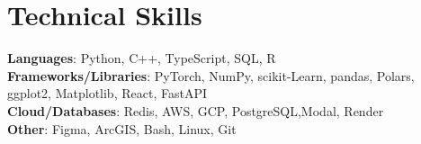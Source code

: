 \documentclass[letterpaper,10pt]{article}
\begin{document}
\section{Technical Skills}
 \begin{itemize}[leftmargin=0.15in, label={}]
    \small{\item{
     \textbf{Languages}{: Python, C++, TypeScript, SQL, R} \\
     \textbf{Frameworks/Libraries}{: PyTorch, NumPy, scikit-Learn, pandas, Polars, ggplot2, Matplotlib, React, FastAPI} \\
     \textbf{Cloud/Databases}{: Redis, AWS, GCP, PostgreSQL,Modal, Render} \\
     \textbf{Other}{: Figma, ArcGIS, Bash, Linux, Git}
    }}
 \end{itemize}


\end{document}
